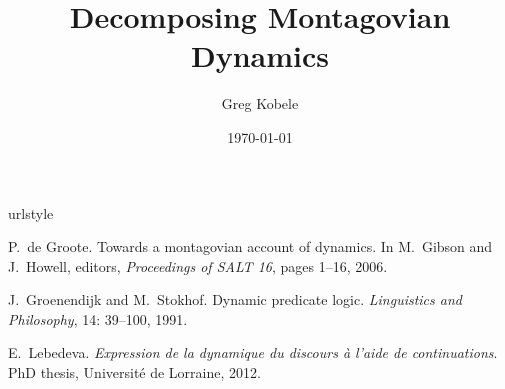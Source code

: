 \documentclass[12pt]{article}
\author{Greg Kobele}
\title{Decomposing Montagovian Dynamics}
\date{\today}
\begin{document}
\maketitle 



\begin{thebibliography}{3}
\providecommand{\natexlab}[1]{#1}
\providecommand{\url}[1]{\texttt{#1}}
\expandafter\ifx\csname urlstyle\endcsname\relax
  \providecommand{\doi}[1]{doi: #1}\else
  \providecommand{\doi}{doi: \begingroup \urlstyle{rm}\Url}\fi

P.~{de Groote}.
\newblock Towards a montagovian account of dynamics.
\newblock In M.~Gibson and J.~Howell, editors, \emph{Proceedings of SALT 16},
  pages 1--16, 2006.

J.~Groenendijk and M.~Stokhof.
\newblock Dynamic predicate logic.
\newblock \emph{Linguistics and Philosophy}, 14: 39--100, 1991.

E.~Lebedeva.
\newblock \emph{Expression de la dynamique du discours \`a l'aide de
  continuations}.
\newblock PhD thesis, Universit\'e de Lorraine, 2012.

\end{thebibliography}
\end{document}
